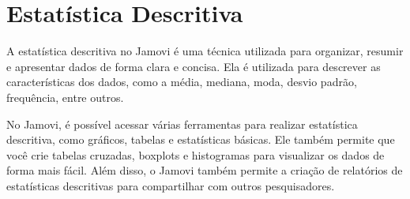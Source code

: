 \chapter{Estatística Descritiva}

A estatística descritiva no Jamovi é uma técnica utilizada para organizar, resumir e apresentar dados de forma clara e concisa. Ela é utilizada para descrever as características dos dados, como a média, mediana, moda, desvio padrão, frequência, entre outros.

No Jamovi, é possível acessar várias ferramentas para realizar estatística descritiva, como gráficos, tabelas e estatísticas básicas. Ele também permite que você crie tabelas cruzadas, boxplots e histogramas para visualizar os dados de forma mais fácil. Além disso, o Jamovi também permite a criação de relatórios de estatísticas descritivas para compartilhar com outros pesquisadores.